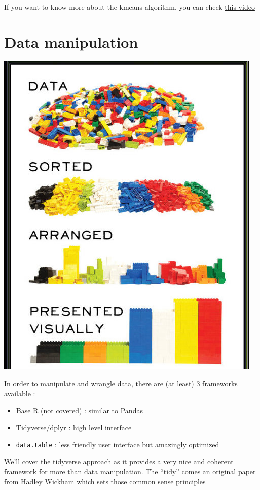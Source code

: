 \documentclass[
]{book}
\providecommand{\tightlist}{%
  \setlength{\itemsep}{0pt}\setlength{\parskip}{0pt}}
\begin{document}
If you want to know more about the kmeans algorithm, you can check \href{https://www.youtube.com/watch?v=4b5d3muPQmA}{this video}

\hypertarget{manip}{%
\chapter{Data manipulation}\label{manip}}

\includegraphics{img/data-viz.jpg}

In order to manipulate and wrangle data, there are (at least) 3 frameworks available :

\begin{itemize}
\tightlist
\item
  Base R (not covered) : similar to Pandas
\item
  Tidyverse/dplyr : high level interface
\item
  \texttt{data.table} : less friendly user interface but amazingly optimized
\end{itemize}

We'll cover the tidyverse approach as it provides a very nice and coherent framework for more than data manipulation. The ``tidy'' comes an original \href{http://www.jstatsoft.org/v59/i10/paper}{paper from Hadley Wickham} which sets those common sense principles
\end{document}
